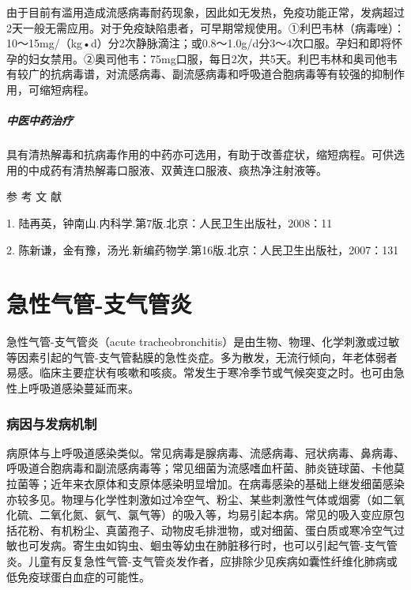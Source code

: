 由于目前有滥用造成流感病毒耐药现象，因此如无发热，免疫功能正常，发病超过2天一般无需应用。对于免疫缺陷患者，可早期常规使用。①利巴韦林（病毒唑）：10～15mg/（kg•d）分2次静脉滴注；或0.8～1.0g/d分3～4次口服。孕妇和即将怀孕的妇女禁用。②奥司他韦：75mg口服，每日2次，共5天。利巴韦林和奥司他韦有较广的抗病毒谱，对流感病毒、副流感病毒和呼吸道合胞病毒等有较强的抑制作用，可缩短病程。

\paragraph{中医中药治疗}

具有清热解毒和抗病毒作用的中药亦可选用，有助于改善症状，缩短病程。可供选用的中成药有清热解毒口服液、双黄连口服液、痰热净注射液等。

\protect\hypertarget{text00265.html}{}{}

\hypertarget{text00265.htmlux5cux23CHP9-1-4}{}
参 考 文 献

1. 陆再英，钟南山.内科学.第7版.北京：人民卫生出版社，2008：11

2.
陈新谦，金有豫，汤光.新编药物学.第16版.北京：人民卫生出版社，2007：131

\protect\hypertarget{text00266.html}{}{}

\chapter{急性气管-支气管炎}

急性气管-支气管炎（acute
tracheobronchitis）是由生物、物理、化学刺激或过敏等因素引起的气管-支气管黏膜的急性炎症。多为散发，无流行倾向，年老体弱者易感。临床主要症状有咳嗽和咳痰。常发生于寒冷季节或气候突变之时。也可由急性上呼吸道感染蔓延而来。

\subsection{病因与发病机制}

病原体与上呼吸道感染类似。常见病毒是腺病毒、流感病毒、冠状病毒、鼻病毒、呼吸道合胞病毒和副流感病毒等；常见细菌为流感嗜血杆菌、肺炎链球菌、卡他莫拉菌等；近年来衣原体和支原体感染明显增加。在病毒感染的基础上继发细菌感染亦较多见。物理与化学性刺激如过冷空气、粉尘、某些刺激性气体或烟雾（如二氧化硫、二氧化氮、氨气、氯气等）的吸入等，均易引起本病。常见的吸入变应原包括花粉、有机粉尘、真菌孢子、动物皮毛排泄物，或对细菌、蛋白质或寒冷空气过敏也可发病。寄生虫如钩虫、蛔虫等幼虫在肺脏移行时，也可以引起气管-支气管炎。儿童有反复急性气管-支气管炎发作者，应排除少见疾病如囊性纤维化肺病或低免疫球蛋白血症的可能性。


